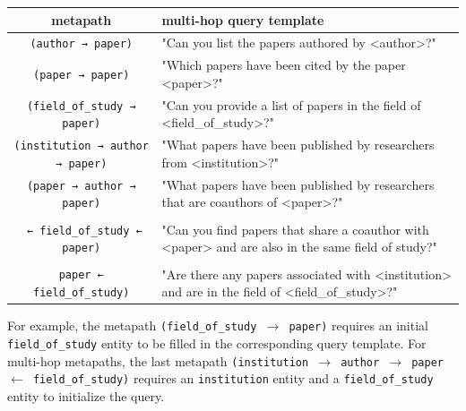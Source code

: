 \begin{table}[h]
\begin{tabularx}{\textwidth}{c|X}
\toprule
metapath          & multi-hop query template\\
\midrule
 \texttt{(author → paper)} & "Can you list the papers authored by <author>?" \\
\texttt{(paper → paper)} &  "Which papers have been cited by the paper <paper>?"\\
\texttt{(field\_of\_study → paper)} & "Can you provide a list of papers in the field of <field\_of\_study>?"\\
\texttt{(institution → author → paper)}& "What papers have been published by researchers from <institution>?"\\
\texttt{(paper → author → paper)}& "What papers have been published by researchers that are coauthors of <paper>?"\\
\makecell{\texttt{(paper → author → paper} \\ \texttt{ ← field\_of\_study ← paper)}}&"Can you find papers that share a coauthor with <paper> and are also in the same field of study?" \\
\makecell{\texttt{(institution → author → } \\ \texttt{paper ← field\_of\_study)}} & "Are there any papers associated with <institution> and are in the field of <field\_of\_study>?" \\
\bottomrule
\end{tabularx}
\end{table}

For example, the metapath \texttt{(field\_of\_study $\rightarrow$ paper)} requires an initial \texttt{field\_of\_study} entity to be filled in the corresponding query template. For multi-hop metapaths, the last metapath \texttt{(institution $\rightarrow$ author $\rightarrow$ paper $\leftarrow$ field\_of\_study)} requires an \texttt{institution} entity and a \texttt{field\_of\_study} entity to initialize the query. 

